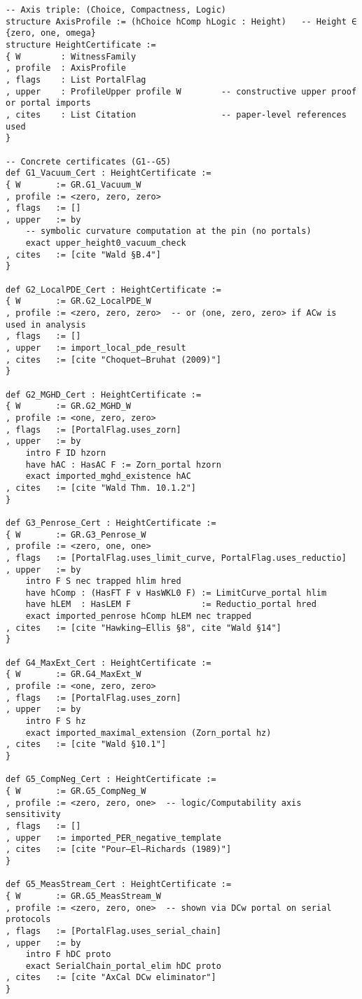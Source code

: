 \documentclass[11pt]{article}
\theoremstyle{definition}
\theoremstyle{remark}
\begin{document}
\begin{verbatim}
-- Axis triple: (Choice, Compactness, Logic)
structure AxisProfile := (hChoice hComp hLogic : Height)   -- Height ∈ {zero, one, omega}
structure HeightCertificate :=
{ W        : WitnessFamily
, profile  : AxisProfile
, flags    : List PortalFlag
, upper    : ProfileUpper profile W        -- constructive upper proof or portal imports
, cites    : List Citation                 -- paper-level references used
}

-- Concrete certificates (G1--G5)
def G1_Vacuum_Cert : HeightCertificate :=
{ W       := GR.G1_Vacuum_W
, profile := <zero, zero, zero>
, flags   := []
, upper   := by
    -- symbolic curvature computation at the pin (no portals)
    exact upper_height0_vacuum_check
, cites   := [cite "Wald §B.4"]
}

def G2_LocalPDE_Cert : HeightCertificate :=
{ W       := GR.G2_LocalPDE_W
, profile := <zero, zero, zero>  -- or ⟨one, zero, zero> if ACw is used in analysis
, flags   := []
, upper   := import_local_pde_result
, cites   := [cite "Choquet–Bruhat (2009)"]
}

def G2_MGHD_Cert : HeightCertificate :=
{ W       := GR.G2_MGHD_W
, profile := <one, zero, zero>
, flags   := [PortalFlag.uses_zorn]
, upper   := by
    intro F ID hzorn
    have hAC : HasAC F := Zorn_portal hzorn
    exact imported_mghd_existence hAC
, cites   := [cite "Wald Thm. 10.1.2"]
}

def G3_Penrose_Cert : HeightCertificate :=
{ W       := GR.G3_Penrose_W
, profile := <zero, one, one>
, flags   := [PortalFlag.uses_limit_curve, PortalFlag.uses_reductio]
, upper   := by
    intro F S nec trapped hlim hred
    have hComp : (HasFT F ∨ HasWKL0 F) := LimitCurve_portal hlim
    have hLEM  : HasLEM F              := Reductio_portal hred
    exact imported_penrose hComp hLEM nec trapped
, cites   := [cite "Hawking–Ellis §8", cite "Wald §14"]
}

def G4_MaxExt_Cert : HeightCertificate :=
{ W       := GR.G4_MaxExt_W
, profile := <one, zero, zero>
, flags   := [PortalFlag.uses_zorn]
, upper   := by
    intro F S hz
    exact imported_maximal_extension (Zorn_portal hz)
, cites   := [cite "Wald §10.1"]
}

def G5_CompNeg_Cert : HeightCertificate :=
{ W       := GR.G5_CompNeg_W
, profile := <zero, zero, one>  -- logic/Computability axis sensitivity
, flags   := []
, upper   := imported_PER_negative_template
, cites   := [cite "Pour–El–Richards (1989)"]
}

def G5_MeasStream_Cert : HeightCertificate :=
{ W       := GR.G5_MeasStream_W
, profile := <zero, zero, one>  -- shown via DCw portal on serial protocols
, flags   := [PortalFlag.uses_serial_chain]
, upper   := by
    intro F hDC proto
    exact SerialChain_portal_elim hDC proto
, cites   := [cite "AxCal DCw eliminator"]
}
\end{verbatim}
\end{document}
